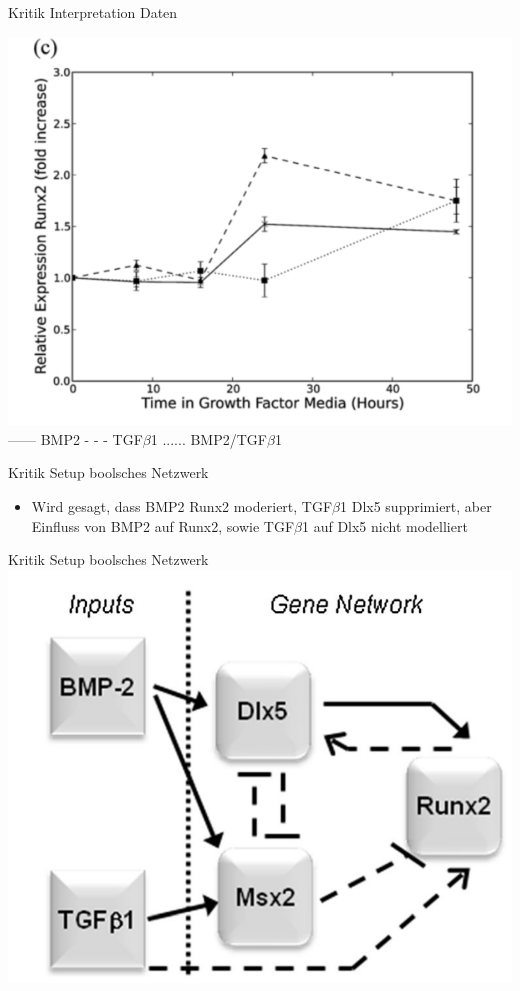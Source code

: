 \documentclass[]{beamer}
\begin{document}
\begin{frame}{Kritik Interpretation Daten}
\begin{center}
			\includegraphics[scale=0.18]{Expression_Runx2.jpg}
	\\------ BMP2 - - - TGF$\beta$1 ...... BMP2/TGF$\beta$1
\end{center}
\end{frame}

\begin{frame}{Kritik Setup boolsches Netzwerk}
\begin{itemize}
	\item Wird gesagt, dass BMP2 Runx2 moderiert, TGF$\beta$1 Dlx5 supprimiert, aber Einfluss von BMP2 auf Runx2, sowie TGF$\beta$1 auf Dlx5 nicht modelliert
\end{itemize}
\end{frame}

\begin{frame}{Kritik Setup boolsches Netzwerk}
		 \includegraphics[scale=0.22]{regulatory_network.jpg}
\end{frame}
\end{document}

